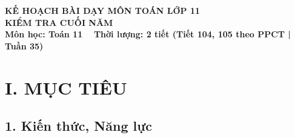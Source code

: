 \documentclass[12pt, a4paper]{article}
\begin{document}
\begin{center}
    {\fontsize{14pt}{17pt}\selectfont \textbf{KẾ HOẠCH BÀI DẠY MÔN TOÁN LỚP 11}}\\[6pt]
    {\fontsize{16pt}{19pt}\selectfont \textbf{KIỂM TRA CUỐI NĂM}}\\[4pt]
    {\fontsize{12pt}{15pt}\selectfont \textbf{Môn học: Toán 11} \ \textbar \ \textbf{Thời lượng: 2 tiết (Tiết 104, 105 theo PPCT | Tuần 35)}}
\end{center}

\vspace{5pt}

\section*{I. MỤC TIÊU}

\subsection*{1. Kiến thức, Năng lực}
\end{document}
